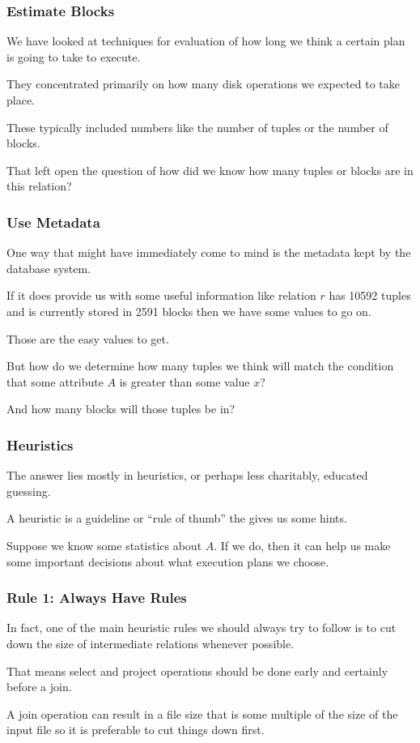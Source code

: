 \begin{frame}
\frametitle{Estimate Blocks}

We have looked at techniques for evaluation of how long we think a certain plan is going to take to execute.

They concentrated primarily on how many disk operations we expected to take place. 

These typically included numbers like the number of tuples or the number of blocks.

That left open the question of how did we know how many tuples or blocks are in this relation?

\end{frame}


\begin{frame}
\frametitle{Use Metadata}

One way that might have immediately come to mind is the metadata kept by the database system. 

If it does provide us with some useful information like relation $r$ has 10592 tuples and is currently stored in 2591 blocks then we have some values to go on. 

Those are the easy values to get. 

But how do we determine how many tuples we think will match the condition that some attribute $A$ is greater than some value $x$? 

And how many blocks will those tuples be in?


\end{frame}

\begin{frame}
\frametitle{Heuristics}
The answer lies mostly in \alert{heuristics}, or perhaps less charitably, educated guessing. 

A heuristic is a guideline or ``rule of thumb'' the gives us some hints. 

Suppose we know some statistics about $A$. If we do, then it can help us make some important decisions about what execution plans we choose. 


\end{frame}


\begin{frame}
\frametitle{Rule 1: Always Have Rules}
In fact, one of the main heuristic rules we should always try to follow is to cut down the size of intermediate relations whenever possible. 

That means select and project operations should be done early and certainly before a join. 

A join operation can result in a file size that is some multiple of the size of the input file so it is preferable to cut things down first.


\end{frame}


